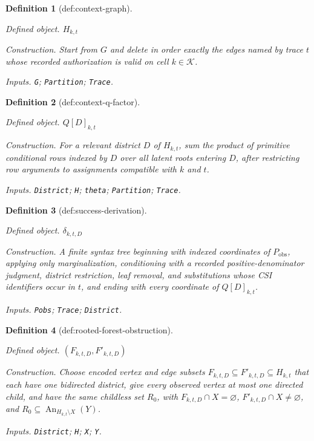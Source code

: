 \documentclass{article}
\newtheorem{definition}{Definition}
\begin{document}
\begin{definition}[def:context-graph]\label{def:context-graph}
\par\smallskip\noindent\emph{Defined object.} \(H_{k,t}\)
\par\smallskip\noindent\emph{Construction.} Start from \(G\) and delete in order exactly the edges named by trace \(t\) whose recorded authorization is valid on cell \(k\in\mathcal K\).
\par\smallskip\noindent\emph{Inputs.} \texttt{G}; \texttt{Partition}; \texttt{Trace}.
\end{definition}

\begin{definition}[def:context-q-factor]\label{def:context-q-factor}
\par\smallskip\noindent\emph{Defined object.} \(Q[D]_{k,t}\)
\par\smallskip\noindent\emph{Construction.} For a relevant district \(D\) of \(H_{k,t}\), sum the product of primitive conditional rows indexed by \(D\) over all latent roots entering \(D\), after restricting row arguments to assignments compatible with \(k\) and \(t\).
\par\smallskip\noindent\emph{Inputs.} \texttt{District}; \texttt{H}; \texttt{theta}; \texttt{Partition}; \texttt{Trace}.
\end{definition}

\begin{definition}[def:success-derivation]\label{def:success-derivation}
\par\smallskip\noindent\emph{Defined object.} \(\delta_{k,t,D}\)
\par\smallskip\noindent\emph{Construction.} A finite syntax tree beginning with indexed coordinates of \(P_{\mathrm{obs}}\), applying only marginalization, conditioning with a recorded positive-denominator judgment, district restriction, leaf removal, and substitutions whose CSI identifiers occur in \(t\), and ending with every coordinate of \(Q[D]_{k,t}\).
\par\smallskip\noindent\emph{Inputs.} \texttt{Pobs}; \texttt{Trace}; \texttt{District}.
\end{definition}

\begin{definition}[def:rooted-forest-obstruction]\label{def:rooted-forest-obstruction}
\par\smallskip\noindent\emph{Defined object.} \((F_{k,t,D},F'_{k,t,D})\)
\par\smallskip\noindent\emph{Construction.} Choose encoded vertex and edge subsets \(F_{k,t,D}\subseteq F'_{k,t,D}\subseteq H_{k,t}\) that each have one bidirected district, give every observed vertex at most one directed child, and have the same childless set \(R_0\), with \(F_{k,t,D}\cap X=\varnothing\), \(F'_{k,t,D}\cap X\ne\varnothing\), and \(R_0\subseteq\operatorname{An}_{H_{k,t}\setminus X}(Y)\).
\par\smallskip\noindent\emph{Inputs.} \texttt{District}; \texttt{H}; \texttt{X}; \texttt{Y}.
\end{definition}
\end{document}
